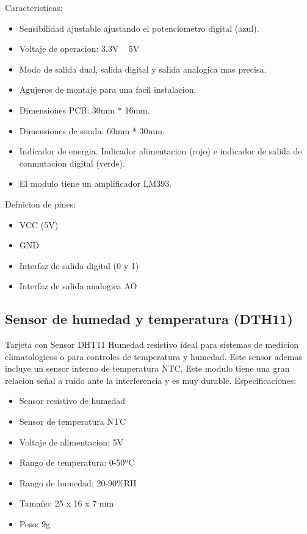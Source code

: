 \documentclass{article}
\begin{document}
Caracteristicas:

\begin{itemize}
	\item Sensibilidad ajustable ajustando el potenciometro digital (azul).
	\item Voltaje de operacion: 3.3V ~ 5V
	\item Modo de salida dual, salida digital y salida analogica mas precisa.
	\item Agujeros de montaje para una facil instalacion.
	\item Dimensiones PCB: 30mm * 16mm.
	\item Dimensiones de sonda: 60mm * 30mm.
	\item Indicador de energia. Indicador alimentacion (rojo) e indicador de salida de conmutacion digital (verde).
	\item El modulo tiene un amplificador LM393.
\end{itemize}

Defnicion de pines:

\begin{itemize}
	\item VCC (5V)
	\item GND
	\item Interfaz de salida digital (0 y 1) 
	\item Interfaz de salida analogica AO
\end{itemize}

\subsection{Sensor de humedad  y temperatura (DTH11)}
Tarjeta con Sensor DHT11 Humedad resistivo ideal para sistemas de medicion climatologicos o para controles de temperatura y humedad. Este sensor ademas incluye un sensor interno de temperatura NTC. Este modulo tiene una gran relacion señal a ruido ante la interferencia y es muy durable.
Especificaciones:

\begin{itemize}
	\item Sensor resistivo de humedad
	\item Sensor de temperatura NTC
	\item Voltaje de alimentacion: 5V
	\item Rango de temperatura: 0-50ºC
	\item Rango de humedad: 20-90{\%}RH
	\item Tamaño: 25 x 16 x 7 mm
	\item Peso: 9g
\end{itemize}
\end{document}
